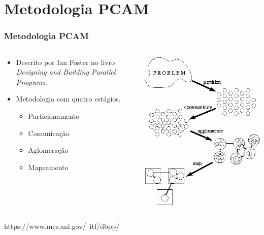 \documentclass[xcolor={usenames,dvipsnames},12pt,presentation,aspectratio=169]{beamer}
\begin{document}
\section{Metodologia PCAM}
\begin{frame}
  \frametitle{Metodologia PCAM}
  \vspace{-3mm}
   \begin{columns}
     \begin{column}{0.6\textwidth}
      \begin{itemize}
        \item Descrito por Ian Foster no livro \emph{Designing and Building Parallel Programs}.
        \item Metodologia com quatro estágios.
          \begin{itemize}
            \item Particionamento
            \item Comunicação
            \item Aglomeração
            \item Mapeamento
          \end{itemize}
      \end{itemize}
     \end{column}
     \begin{column}{0.4\textwidth}
        \begin{center}
        \includegraphics[width=\textwidth]{pcam.png}
        \end{center}
     \end{column}
   \end{columns}
  {\tiny https://www.mcs.anl.gov/~itf/dbpp/}
\end{frame}
\end{document}
